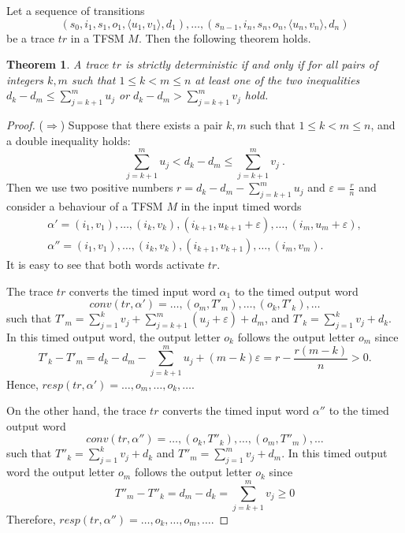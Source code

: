 \documentclass[conference]{IEEEtran}
\newtheorem{theorem}{Theorem}
\begin{document}

Let a sequence of transitions
$$
(s_0, i_1, s_1, o_1, \langle u_1, v_1 \rangle, d_1), \dots, (s_{n - 1}, i_n, s_n, o_n, \langle u_n, v_n \rangle, d_n)
$$
be a trace $tr$ in a TFSM $M$.
Then the following theorem holds.

\begin{theorem}
{\itshape
A trace $tr$ is strictly deterministic if and only if for all pairs of integers $k, m$ such that $1 \leq k < m \leq n$ at least one of the two inequalities $d_k - d_m \leq \sum\limits_{j = k + 1}^{m}u_j$ or $d_k - d_m > \sum\limits_{j = k + 1}^{m}v_j$ hold.
}
\end{theorem}
\begin{proof}

($\Rightarrow$) Suppose that there exists a pair $k, m$ such that $1 \leq k < m \leq n$, and a double inequality holds:
$$
\sum\limits_{j = k + 1}^{m}u_j < d_k - d_m \leq \sum\limits_{j = k + 1}^{m}v_j \ .
$$
Then we use two positive numbers $r = d_k - d_m - \sum\limits_{j = k + 1}^{m}u_j$ and $\varepsilon = \frac{r}{n}$ and consider a behaviour of a TFSM $M$ in the input timed words
$$
\begin{array}{l}
\alpha' = (i_1, v_1), \dots, (i_k, v_k), (i_{k + 1}, u_{k + 1}\!+\!\varepsilon),\!\dots,\!(i_m, u_m\!+\!\varepsilon),\\
\alpha'' = (i_1, v_1), \dots, (i_k, v_k), (i_{k + 1}, v_{k + 1}), \dots, (i_m, v_m).
\end{array}
$$
It is easy to see that both words activate $tr$. 

The trace $tr$ converts the timed input word $\alpha_1$ to the timed output word  
$$
conv(tr,\alpha')= \dots, (o_m, T'_m), \dots, (o_k, T'_k), \dots
$$
such that $T'_m = \sum\limits_{j = 1}^{k}v_j + \sum\limits_{j = k + 1}^{m}(u_j + \varepsilon) + d_m$, and $T'_k = \sum\limits_{j = 1}^{k}v_j + d_k$. In this timed output word, the output letter $o_k$ follows the output letter $o_m$ since
$$
T'_k - T'_m = d_k - d_m - \sum\limits_{j = k + 1}^{m}u_j + (m - k)\varepsilon = r - \frac{r(m - k)}{n} > 0.
$$
Hence, $resp(tr, \alpha') = \dots, o_m, \dots, o_k, \dots$.

 On the other hand, the trace $tr$ converts the timed input word $\alpha''$ to the timed output word
$$
conv(tr,\alpha'')= \dots, (o_k, T''_k), \dots, (o_m, T''_m), \dots
$$
such that $T''_k = \sum\limits_{j = 1}^{k}v_j + d_k$ and $T''_m = \sum\limits_{j = 1}^{m}v_j + d_m$. In this timed output word the output letter $o_m$ follows the output letter $o_k$ since
$$
T''_m - T''_k = d_m - d_k = \sum\limits_{j = k + 1}^{m}v_j \geq 0
$$
Therefore, $resp(tr, \alpha'') = \dots, o_k, \dots, o_m, \dots$.


\end{proof}
\end{document}
